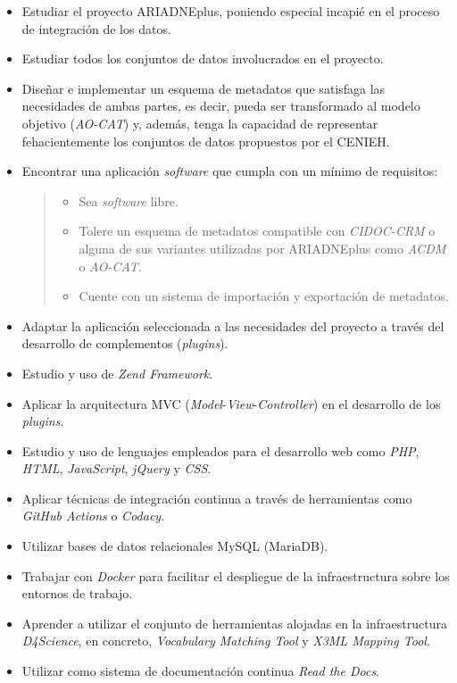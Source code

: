 \documentclass[
]{article}
\providecommand{\tightlist}{%
  \setlength{\itemsep}{0pt}\setlength{\parskip}{0pt}}
\begin{document}
\begin{itemize}
\item
  Estudiar el proyecto ARIADNEplus, poniendo especial incapié en el
  proceso de integración de los datos.
\item
  Estudiar todos los conjuntos de datos involucrados en el proyecto.
\item
  Diseñar e implementar un esquema de metadatos que satisfaga las
  necesidades de ambas partes, es decir, pueda ser transformado al
  modelo objetivo (\emph{AO-CAT}) y, además, tenga la capacidad de
  representar fehacientemente los conjuntos de datos propuestos por el
  CENIEH.
\item
  Encontrar una aplicación \emph{software} que cumpla con un mínimo de
  requisitos:

  \begin{quote}
  \begin{itemize}
  \tightlist
  \item
    Sea \emph{software} libre.
  \item
    Tolere un esquema de metadatos compatible con \emph{CIDOC-CRM} o
    alguna de sus variantes utilizadas por ARIADNEplus como \emph{ACDM}
    o \emph{AO-CAT}.
  \item
    Cuente con un sistema de importación y exportación de metadatos.
  \end{itemize}
  \end{quote}
\item
  Adaptar la aplicación seleccionada a las necesidades del proyecto a
  través del desarrollo de complementos (\emph{plugins}).
\item
  Estudio y uso de \emph{Zend Framework}.
\item
  Aplicar la arquitectura MVC
  (\emph{Model}-\emph{View}-\emph{Controller}) en el desarrollo de los
  \emph{plugins}.
\item
  Estudio y uso de lenguajes empleados para el desarrollo web como
  \emph{PHP}, \emph{HTML}, \emph{JavaScript}, \emph{jQuery} y
  \emph{CSS}.
\item
  Aplicar técnicas de integración continua a través de herramientas como
  \emph{GitHub Actions} o \emph{Codacy}.
\item
  Utilizar bases de datos relacionales MySQL (MariaDB).
\item
  Trabajar con \emph{Docker} para facilitar el despliegue de la
  infraestructura sobre los entornos de trabajo.
\item
  Aprender a utilizar el conjunto de herramientas alojadas en la
  infraestructura \emph{D4Science}, en concreto, \emph{Vocabulary
  Matching Tool} y \emph{X3ML Mapping Tool}.
\item
  Utilizar como sistema de documentación continua \emph{Read the Docs}.
\end{itemize}
\end{document}
